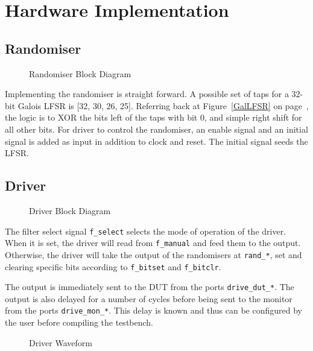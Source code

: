\chapter{Hardware Implementation}

\section{Randomiser}

\begin{figure}[H]
  \centering
  
  \caption{Randomiser Block Diagram}
  \label{RandomiserBlk}
\end{figure}

Implementing the randomiser is straight forward.
A possible set of taps for a 32-bit Galois LFSR is [32, 30, 26, 25].
Referring back at Figure~\ref{GalLFSR} on page~\pageref{GalLFSR},
the logic is to XOR the bits left of the taps with bit 0, and simple right shift for all other bits.
For driver to control the randomiser, an enable signal and an initial signal is added as input in addition to clock and reset.
The initial signal seeds the LFSR.

\section{Driver}

\begin{figure}[H]
  \centering
  
  \caption{Driver Block Diagram}
  \label{DriverBlk}
\end{figure}

The filter select signal \texttt{f\_select} selects the mode of operation of the driver.
When it is set, the driver will read from \texttt{f\_manual} and feed them to the output.
Otherwise, the driver will take the output of the randomisers at \texttt{rand\_*}, set and clearing specific bits according to \texttt{f\_bitset} and \texttt{f\_bitclr}.

The output is immediately sent to the DUT from the ports \texttt{drive\_dut\_*}.
The output is also delayed for a number of cycles before being sent to the monitor from the ports \texttt{drive\_mon\_*}.
This delay is known and thus can be configured by the user before compiling the testbench.

\begin{figure}[H]
  \centering
  
  \caption{Driver Waveform}
  \label{DriveWave}
\end{figure}

